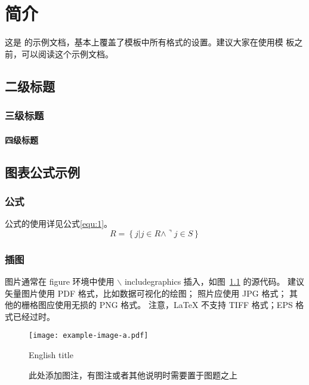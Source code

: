 \chapter{简介}

这是 \bjfuthesis 的示例文档，基本上覆盖了模板中所有格式的设置。建议大家在使用模
板之前，可以阅读这个示例文档。

\section{二级标题}

\subsection{三级标题}

\subsubsection{四级标题}


\section{图表公式示例}
\subsection{公式}
公式的使用详见公式\eqref{equ:1}。
\begin{equation}
    R = \left\{ j | j \in  R \wedge \urcorner j \in S  \right\}
    \label{equ:1} %
\end{equation}

\subsection{插图}

图片通常在 figure 环境中使用\cite{dupont1974bone}\cite{jianduju1994}  $\backslash$ includegraphics 插入，如图~\ref{fig:example} 的源代码。
建议矢量图片使用 PDF 格式，比如数据可视化的绘图；
照片应使用 JPG 格式；
其他的栅格图应使用无损的 PNG 格式。
注意，LaTeX 不支持 TIFF 格式；EPS 格式已经过时。

\begin{figure}[h]
	\centering
	\texttt{[image: example-image-a.pdf]}
	\caption*{此处添加图注，有图注或者其他说明时需要置于图题之上}
	 {English title}

	\label{fig:example}
\end{figure}

